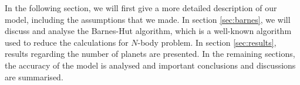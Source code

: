In the following section, we will first give a more detailed description of our model, including the assumptions that we made. 
In section \ref{sec:barnes}, we will discuss and analyse the Barnes-Hut algorithm, which is a well-known algorithm used to reduce the calculations for $N$-body problem. In  section \ref{sec:results}, results regarding the number of planets are presented. 
In the remaining sections, the accuracy of the model is analysed and important conclusions and discussions are summarised. 
 